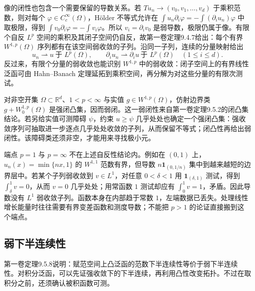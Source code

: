 \ProseParagraphBreak

像的闭性也包含一个需要保留的导数关系。若 \(Tu_n\to(v_0,v_1,\ldots,v_d)\) 于乘积范数，则对每个 \(\varphi\in C_c^\infty(\Omega)\)，Hölder 不等式允许在
\(\int u_n\partial_i\varphi=-\int(\partial_i u_n)\varphi\) 中取极限，得到
\(\int v_0\partial_i\varphi=-\int v_i\varphi\)。所以 \(v_i=\partial_i v_0\) 是弱导数，极限仍属于像。有限个自反 \(L^p\) 空间的乘积及其闭子空间仍自反，故第一卷定理9.4.7给出：每个有界 \(W^{1,p}(\Omega)\) 序列都有在该空间弱收敛的子列。沿同一子列，连续的分量映射给出
\[
 u_n\rightharpoonup u\ \text{于 }L^p(\Omega),\qquad
 \partial_i u_n\rightharpoonup\partial_i u\ \text{于 }L^p(\Omega)
 \quad(1\leq i\leq d).
\]
反过来，有限个分量的弱收敛也能识别 \(W^{1,p}\) 中的弱收敛：闭子空间上的有界线性泛函可由 Hahn--Banach 定理延拓到乘积空间，再分解为对这些分量的有限次测试。

\ProseParagraphBreak

对非空开集 \(\Omega\subset\mathbb R^d\)、\(1<p<\infty\) 与实值 \(g\in W^{1,p}(\Omega)\)，仿射边界类 \(g+W_0^{1,p}(\Omega)\) 是强闭凸集，因而弱闭。这一弱闭性来自第一卷定理9.5.2的闭凸集结论。若另给实值可测障碍 \(\psi\)，约束 \(u\ge\psi\) 几乎处处也确定一个强闭凸集：强收敛序列可抽取进一步逐点几乎处处收敛的子列，从而保留不等式；闭凸性再给出弱闭性。该障碍类还须非空，才能用来寻找极小元。

\ProseParagraphBreak

端点 \(p=1\) 与 \(p=\infty\) 不在上述自反性结论内。例如在 \((0,1)\) 上，\(u_n(x)=\min\{nx,1\}\) 的 \(W^{1,1}\) 范数有界，但导数 \(n\mathbf1_{(0,1/n)}\) 集中到越来越短的边界层中。若某个子列弱收敛到 \(v\in L^1\)，对任意 \(0<\delta<1\) 用 \(\mathbf1_{(\delta,1)}\) 测试，得到 \(\int_\delta^1v=0\)，从而 \(v=0\) 几乎处处；用常函数 \(1\) 测试却应有 \(\int_0^1v=1\)，矛盾。因此导数没有 \(L^1\) 弱收敛子列。函数本身在内部趋于常数 \(1\)，左端数据已丢失。处理线性增长能量时往往需要有界变差函数和测度导数；不能把 \(p>1\) 的论证直接搬到这个端点。

\subsection{弱下半连续性}
\label{b2:subsec:140404}

第一卷定理9.5.8说明：赋范空间上凸泛函的范数下半连续性等价于弱下半连续性。对积分泛函，可以先证强收敛下的下半连续，再利用凸性改变拓扑。不过在取积分之前，还须确认被积函数可测。

\ProseParagraphBreak

